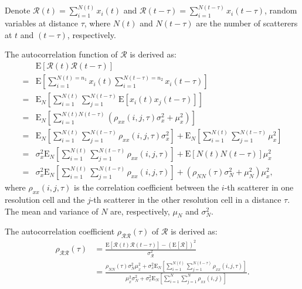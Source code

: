 \documentclass[journal]{IEEEtran}
\begin{document}
Denote $\mathcal{R}(t)=\sum_{i=1}^{N(t)} x_{i}(t)$ and $\mathcal{R}(t-\tau)=\sum_{i=1}^{N(t-\tau)} x_{i}(t-\tau)$,
random variables at distance $\tau$, where $N(t)$ and $N(t-\tau)$ are the number of scatterers at $t$ and $(t-\tau)$, respectively.

The autocorrelation function of $\mathcal{R}$ is derived as:
\begin{align}
& \mathrm{E}[\mathcal{R}(t) \mathcal{R}(t-\tau)] \nonumber\\
= {} & \mathrm{E}\left[\sum_{i=1}^{N(t)=n_{1}} x_{i}(t) \sum_{i=1}^{N(t-\tau)=n_{2}} x_{i}(t-\tau)\right] \nonumber\\
= {} & \mathrm{E}_{N}\left[\sum_{i=1}^{N(t)} \sum_{j=1}^{N(t-\tau)} \mathrm{E}\left[x_{i}(t) x_{j}(t-\tau)\right]\right] \nonumber\\
= {} & \mathrm{E}_{N}\left[\sum_{i=1}^{N(t) N(t-\tau)}\left(\rho_{x x}(i, j, \tau) \sigma_{x}^{2}+\mu_{x}^{2}\right)\right] \nonumber\\
= {} & \mathrm{E}_{N}\left[\sum_{i=1}^{N(t)} \sum_{j=1}^{N(t-\tau)} \rho_{x x}(i, j, \tau) \sigma_{x}^{2}\right] + \mathrm{E}_{N}\left[\sum_{i=1}^{N(t)} \sum_{j=1}^{N(t-\tau)} \mu_{x}^{2}\right] \nonumber\\
= {} & \sigma_{x}^{2} \mathrm{E}_{N}\left[\sum_{i=1}^{N(t)} \sum_{j=1}^{N(t-\tau)} \rho_{x x}(i, j, \tau)\right] + \mathrm{E}[N(t) N(t-\tau)] \mu_{x}^{2} \nonumber\\
= {} & \sigma_{x}^{2} \mathrm{E}_{N}\left[\sum_{i=1}^{N(t)} \sum_{j=1}^{N(t-\tau)} \rho_{x x}(i, j, \tau)\right] + \left(\rho_{N N}(\tau) \sigma_{N}^{2}+\mu_{N}^{2}\right) \mu_{x}^{2},
\label{eqA2}
\end{align}
where $\rho_{x x}(i, j, \tau)$ is the correlation coefficient between the $i$-th scatterer in one resolution cell and the $j$-th scatterer in the other resolution cell in a distance $\tau$.
The mean and variance of $N$ are, respectively, $\mu_{N}$ and
$\sigma_{N}^{2}$.

The autocorrelation coefficient $\rho_{\mathcal{R} \mathcal{R}}(\tau)$ of $\mathcal{R}$ is derived as:
\begin{align}
\rho_{\mathcal{R} \mathcal{R}}(\tau) & = \frac{\mathrm{E}[\mathcal{R}(t) \mathcal{R}(t-\tau)]-(\mathrm{E}[\mathcal{R}])^{2}}{\sigma_{\mathcal{R}}^{2}} \nonumber\\
& = \frac{\rho_{N N}(\tau) \sigma_{N}^{2} \mu_{x}^{2}+\sigma_{x}^{2} \mathrm{E}_{N}\left[\sum_{i=1}^{N(t)} \sum_{j=1}^{N(t-\tau)} \rho_{x x}(i, j, \tau)\right]}{\mu_{x}^{2} \sigma_{N}^{2}+\sigma_{x}^{2} \mathrm{E}_{N}\left[\sum_{i=1}^{N} \sum_{j=1}^{N} \rho_{x x}(i, j)\right]}.
\label{eqA3}
\end{align}
\end{document}
